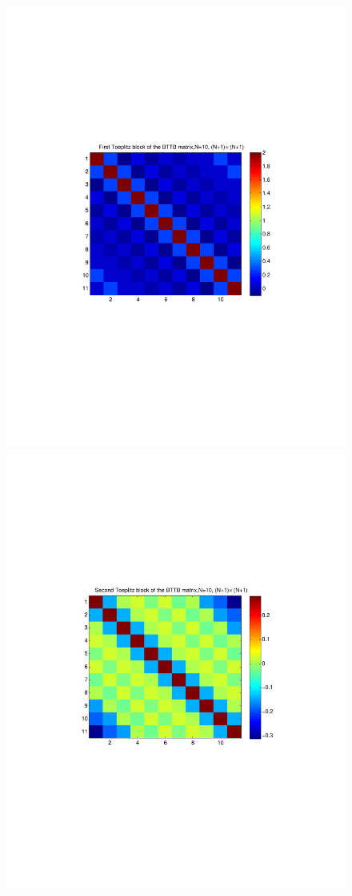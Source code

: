 \documentclass{UCF_ETD}
\begin{document}
 
 \begin{figure}[H]
 \begin{center}
 \includegraphics[scale=0.6]{PolarSphericalDFT/FirstToeplitzBlock}
 \includegraphics[scale=0.6]{PolarSphericalDFT/SecondToeplitzBlock}

\end{center}
\end{figure}
\end{document}
